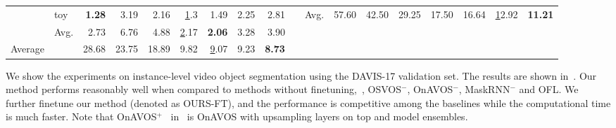 \begin{table}[t]
{{\begin{tabular}{llrrrrrrrllrrrrrrr}
	& toy           & \bf 1.28  & 3.19  & 2.16  & {\ul 1.3}   & 1.49  & 2.25  & 2.81 &         & Avg.       & 57.60 & 42.50 & 29.25 & 17.50 & 16.64 & {\ul 12.92} & \bf 11.21 \\ \cline{2-9}
	& Avg.          & 2.73  & 6.76  & 4.88  & {\ul 2.17}  & \bf 2.06  & 3.28  & 3.90 &         &            &       &       &       &       &       &       &      \\ 
	\midrule[1pt]
	Average & & 28.68  & 23.75 & 18.89 & 9.82 & {\ul 9.07} & 9.23 & \bf 8.73 &         &            &       &       &       &       &       &       &     \\
	\bottomrule
\end{tabular}
}
}
\end{table} 
\begin{table}[t]
	\centering
	{\footnotesize
		
		\caption{Evaluation on the DAVIS-17 validation set.
		}
		\label{tab:davis17}
		\tabcolsep=2pt
}
\end{table} We show the experiments on instance-level video object segmentation using the DAVIS-17 validation set. The results are shown in~. Our method performs reasonably well when compared to methods without finetuning,~\ie, OSVOS$^-$, OnAVOS$^-$, MaskRNN$^-$ and OFL. We further finetune our method (denoted as OURS-FT), and the performance is competitive among the baselines while the computational time is much faster. Note that OnAVOS$^+$~\cite{DAVIS2017_5th} in~ is OnAVOS with upsampling layers on top and model ensembles.



